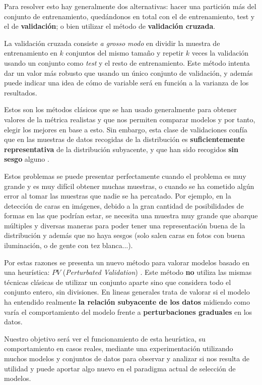 Para resolver esto hay generalmente dos alternativas: hacer una partición más del conjunto de entrenamiento, quedándonos en total con el de entrenamiento, test y el de \textbf{validación}; o bien utilizar el método de \textbf{validación cruzada}.

La validación cruzada consiste \emph{a grosso modo} en dividir la muestra de entrenamiento en $k$ conjuntos del mismo tamaño y repetir $k$ veces la validación usando un conjunto como \emph{test} y el resto de entrenamiento. Este método intenta dar un valor más robusto que usando un único conjunto de validación, y además puede indicar una idea de cómo de variable será en función a la varianza de los resultados.

Estos son los métodos clásicos que se han usado generalmente para obtener valores de la métrica realistas y que nos permiten comparar modelos y por tanto, elegir los mejores en base a esto. Sin embargo, esta clase de validaciones confía que en las muestras de datos recogidas de la distribución es \textbf{suficientemente representativa} de la distribución subyacente, y que han sido recogidos \textbf{sin sesgo} alguno \cite{zhang2019perturbation}.

Estos problemas se puede presentar perfectamente cuando el problema es muy grande y es muy difícil obtener muchas muestras, o cuando se ha cometido algún error al tomar las muestras que nadie se ha percatado. Por ejemplo, en la detección de caras en imágenes, debido a la gran cantidad de posibilidades de formas en las que podrían estar, se necesita una muestra muy grande que abarque múltiples y diversas maneras para poder tener una representación buena de la distribución y además que no haya sesgos (solo salen caras en fotos con buena iluminación, o de gente con tez blanca...).

Por estas razones se presenta un nuevo método para valorar modelos basado en una heurística: $PV$ (\emph{Perturbated Validation}) \cite{zhang2019perturbation}. Este método \textbf{no} utiliza las mismas técnicas clásicas de utilizar un conjunto aparte sino que considera todo el conjunto entero, sin divisiones. En lineas generales trata de valorar si el modelo ha entendido realmente \textbf{la relación subyacente de los datos} midiendo como varía el comportamiento del modelo frente a \textbf{perturbaciones graduales} en los datos.

Nuestro objetivo será ver el funcionamiento de esta heurística, su comportamiento en casos reales, mediante una experimentación utilizando muchos modelos y conjuntos de datos para observar y analizar si nos resulta de utilidad y puede aportar algo nuevo en el paradigma actual de selección de modelos.

